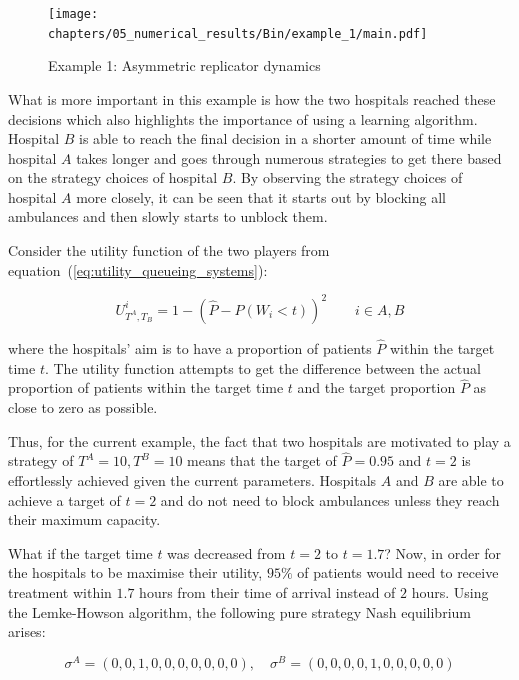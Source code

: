 \begin{figure}[H]
    \centering
    \texttt{[image: chapters/05\_numerical\_results/Bin/example\_1/main.pdf]}
    \caption{Example 1: Asymmetric replicator dynamics}
    \label{fig:asymmetric_replicator_dynamics_example_1}
\end{figure}

What is more important in this example is how the two hospitals reached these
decisions which also highlights the importance of using a learning algorithm.
Hospital \(B\) is able to reach the final decision in a shorter amount of time
while  hospital \(A\) takes longer and goes through numerous strategies to get
there based on the strategy choices of hospital \(B\).
By observing the strategy choices of hospital \(A\) more closely, it can be seen
that it starts out by blocking all ambulances and then slowly starts to unblock
them.

Consider the utility function of the two players from
equation~(\ref{eq:utility_queueing_systems}):

\begin{equation*}
    U_{T^A, T_B}^i = 1 - \left( \hat{P} - P(W_i < t) \right)^2
    \qquad i \in {A, B}
\end{equation*}

where the hospitals' aim is to have a proportion of patients \(\hat{P}\)
within the target time \(t\).
The utility function attempts to get the difference between the actual
proportion of patients within the target time \(t\) and the target proportion
\(\hat{P}\) as close to zero as possible.

Thus, for the current example, the fact that two hospitals are
motivated to play a strategy of \(T^A = 10, T^B = 10\) means that the target
of \(\hat{P} = 0.95\) and \(t = 2\) is effortlessly achieved given the current
parameters.
Hospitals \(A\) and \(B\) are able to achieve a target of \(t = 2\) and do not
need to block ambulances unless they reach their maximum capacity.

What if the target time \(t\) was decreased from \(t = 2\) to \(t = 1.7\)?
Now, in order for the hospitals to be maximise their utility, \(95\%\) of
patients would need to receive treatment within \(1.7\) hours from their time
of arrival instead of \(2\) hours.
Using the Lemke-Howson algorithm, the following pure strategy Nash equilibrium
arises:

\begin{equation}
    \sigma^A = (0, 0, 1, 0, 0, 0, 0, 0, 0, 0), \quad
    \sigma^B = (0, 0, 0, 0, 1, 0, 0, 0, 0, 0)
\end{equation}

